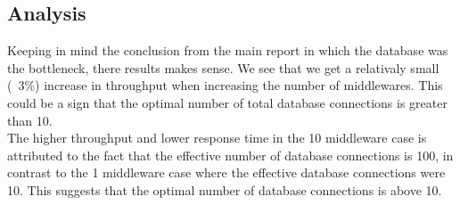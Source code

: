 \documentclass[a4paper, 11pt]{article}
\begin{document}
\subsection{Analysis}
Keeping in mind the conclusion from the main report in which the database was the bottleneck, there results makes sense. We see that we get a relativaly small (~3\%) increase in throughput when increasing the number of middlewares. This could be a sign that the optimal number of total database connections is greater than 10.\\
The higher throughput and lower response time in the 10 middleware case is attributed to the fact that the effective number of database connections is 100, in contrast to the 1 middleware case where the effective database connections were 10. This suggests that the optimal number of database connections is above 10.
\end{document}
